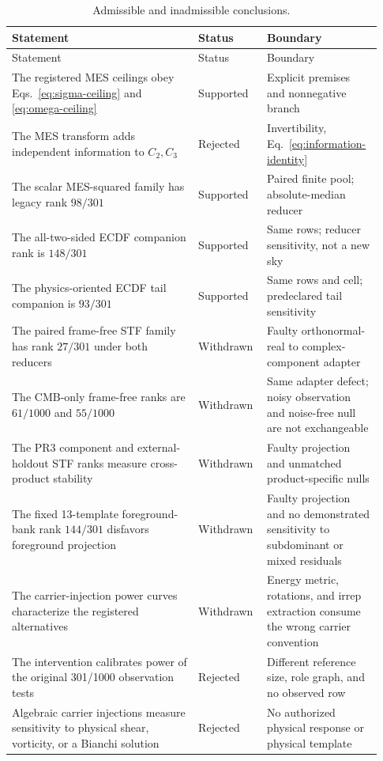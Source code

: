 \documentclass[11pt,a4paper]{article}
\begin{document}
\begin{longtable}{@{}p{0.48\linewidth}p{0.16\linewidth}p{0.29\linewidth}@{}}
\caption{Admissible and inadmissible conclusions.}\label{tab:claims}\\
\toprule
Statement & Status & Boundary\\
\midrule
\endfirsthead
\toprule
Statement & Status & Boundary\\
\midrule
\endhead
The registered MES ceilings obey Eqs.~\eqref{eq:sigma-ceiling} and
\eqref{eq:omega-ceiling} & Supported & Explicit premises and nonnegative branch\\
The MES transform adds independent information to $C_2,C_3$ & Rejected &
Invertibility, Eq.~\eqref{eq:information-identity}\\
The scalar MES-squared family has legacy rank $98/301$ & Supported & Paired
finite pool; absolute-median reducer\\
The all-two-sided ECDF companion rank is $148/301$ & Supported & Same rows;
reducer sensitivity, not a new sky\\
The physics-oriented ECDF tail companion is $93/301$ & Supported & Same rows
and cell; predeclared tail sensitivity\\
The paired frame-free STF family has rank $27/301$ under both reducers &
Withdrawn & Faulty orthonormal-real to complex-component adapter\\
The CMB-only frame-free ranks are $61/1000$ and $55/1000$ & Withdrawn & Same
adapter defect; noisy observation and noise-free null are not exchangeable\\
The PR3 component and external-holdout STF ranks measure cross-product
stability & Withdrawn & Faulty projection and unmatched product-specific nulls\\
The fixed 13-template foreground-bank rank $144/301$ disfavors foreground
projection & Withdrawn & Faulty projection and no demonstrated sensitivity to
subdominant or mixed residuals\\
The carrier-injection power curves characterize the registered alternatives &
Withdrawn & Energy metric, rotations, and irrep extraction consume the wrong
carrier convention\\
The intervention calibrates power of the original 301/1000 observation tests
& Rejected & Different reference size, role graph, and no observed row\\
Algebraic carrier injections measure sensitivity to physical shear,
vorticity, or a Bianchi solution & Rejected & No authorized physical response
or physical template\\

\end{longtable}
\end{document}
